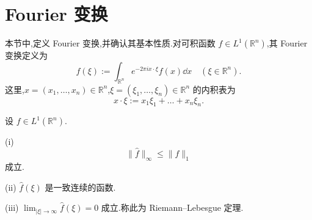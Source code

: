 \section{Fourier 变换}\label{sec:4.3}


本节中,定义 Fourier 变换,并确认其基本性质.对可积函数 $f \in L^{1}(\mathbb{R}^{n})$,其 Fourier 变换定义为
\begin{equation*}
\hat{f}(\xi) := \int_{\mathbb{R}^{n}}e^{-2\pi i x\cdot\xi}f(x)\dd x \quad (\xi \in \mathbb{R}^{n}).
\end{equation*}
这里,$x = (x_{1}, \ldots, x_{n}) \in \mathbb{R}^{n}$,$\xi = (\xi_{1}, \ldots, \xi_{n}) \in \mathbb{R}^{n}$ 的内积表为
\begin{equation*}
x\cdot\xi := x_{1}\xi_{1} + \ldots + x_{n}\xi_{n}.
\end{equation*}

\begin{proposition}\label{prop:4.3.1}
设 $f \in L^{1}(\mathbb{R}^{n})$.

(i)
\begin{equation}
\|\hat{f}\|_{\infty} \leq \|f\|_{1}\tag{4.3.1}
\label{eq:4.3.1}\end{equation}
成立.

(ii) $\hat{f}(\xi)$ 是一致连续的函数.

(iii) $\lim_{|\xi| \to \infty}\hat{f}(\xi) = 0$ 成立.称此为 Riemann--Lebesgue 定理.
\end{proposition}

